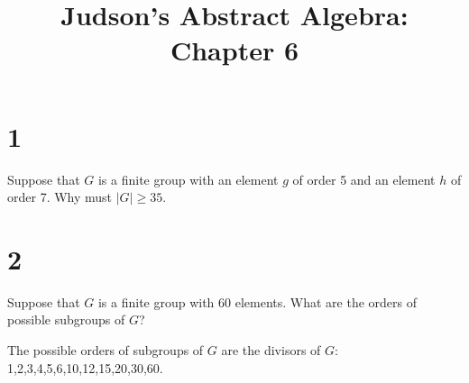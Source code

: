 \documentclass[a4paper]{article}
\title{Judson's Abstract Algebra: Chapter 6}
\date{}
\begin{document}
\maketitle

\section*{1}

Suppose that $G$ is a finite group with an element $g$ of order 5 and an element $h$ of order 7. Why must $|G| \geq 35$.


\section*{2}

Suppose that $G$ is a finite group with 60 elements. What are the orders of possible subgroups of $G$?

\vspace{\baselineskip}

The possible orders of subgroups of $G$ are the divisors of $G$: 1,2,3,4,5,6,10,12,15,20,30,60.
\end{document}
